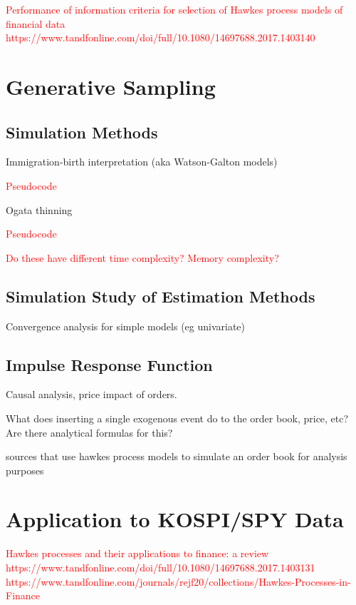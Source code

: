 \documentclass[honours,12pt]{unswthesis}
\numberwithin{equation}{section}
\begin{document}
\textcolor{red}{Performance of information criteria for selection of Hawkes process models of financial data https://www.tandfonline.com/doi/full/10.1080/14697688.2017.1403140}

\chapter{Generative Sampling}
\section{Simulation Methods}
Immigration-birth interpretation \cite{MorariuPatrichiPakkanen}
(aka Watson-Galton models)

\textcolor{red}{Pseudocode}

Ogata thinning 

\textcolor{red}{Pseudocode}

\textcolor{red}{Do these have different time complexity? Memory complexity?}

\section{Simulation Study of Estimation Methods}
Convergence analysis for simple models (eg univariate)

\section{Impulse Response Function}
Causal analysis, price impact of orders.

What does inserting a single exogenous event do to the order book, price, etc? Are there analytical formulas for this?


\cite{AbergelJedidi} \cite{Toke} sources that use hawkes process models to simulate an order book for analysis purposes


\chapter{Application to KOSPI/SPY Data} %
\textcolor{red}{Hawkes processes and their applications to finance: a review https://www.tandfonline.com/doi/full/10.1080/14697688.2017.1403131}
\textcolor{red}{https://www.tandfonline.com/journals/rejf20/collections/Hawkes-Processes-in-Finance}
\end{document}
